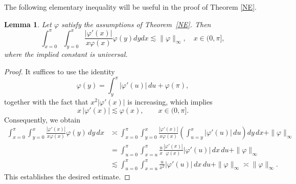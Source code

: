 \documentclass[12pt,reqno,a4paper]{amsart}
\newtheorem{lem}[prop]{Lemma}
\numberwithin{equation}{section}
\begin{document}
\noindent The following elementary inequality will be useful in the proof of Theorem \ref{NE}.
\begin{lem}\label{EI}
	Let $\varphi$ satisfy the assumptions of Theorem~\ref{NE}. Then
	$$
	\displaystyle \int _{x=0}^{\pi}  \displaystyle \int _{y=0}^x\frac{|\varphi '(x)|}{x \varphi(x)}\varphi (y)dydx \lesssim \|\varphi \|_\infty, \quad x\in  (0,\pi],
	$$
	where the implied constant is universal.
\end{lem}
\begin{proof}
	It suffices to use the identity
	\[
	\varphi(y)=\int_{y}^{\pi} |\varphi'(u)|\,du + \varphi( \pi),
	\]
	together with the fact that $x^2|\varphi'(x)|$ is increasing, which implies
	\[
	x\,|\varphi'(x)| \lesssim \varphi(x), \qquad x \in (0,\pi].
	\]
	Consequently, we obtain 
	\begin{align*}
		\int_{x=0}^{\pi} \int_{y=0}^{x} \frac{|\varphi'(x)|}{x \varphi(x)} \varphi(y)\, dy\, dx
		&\asymp \int_{x=0}^{\pi} \int_{y=0}^{x} \frac{|\varphi'(x)|}{x \varphi(x)} \left( \int_{u=y}^{x} |\varphi'(u)| \, du \right) dy\, dx + \|\varphi\|_\infty \\
		&= \int_{u=0}^{\pi} \int_{x=u}^{\pi} \frac{u}{x} \frac{|\varphi'(x)|}{ \varphi(x)} |\varphi'(u)| \, dx\,  du + \|\varphi\|_\infty\\
		&\lesssim \int_{u=0}^{\pi} \int_{x=u}^{\pi} \frac{u}{x^2} |\varphi'(u)| \, dx\,  du + \|\varphi\|_\infty
		\asymp \|\varphi\|_\infty.
	\end{align*}
	This establishes the desired estimate.
\end{proof}
\end{document}
